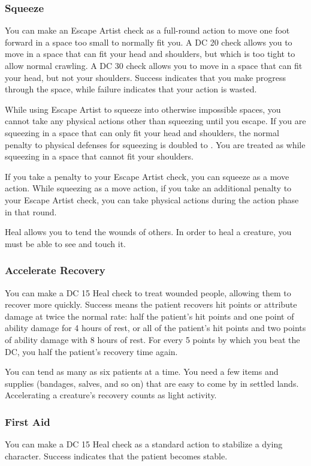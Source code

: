 \subsubsection{Squeeze}
You can make an Escape Artist check as a full-round action to move one foot forward in a space too small to normally fit you. A DC 20 check allows you to move in a space that can fit your head and shoulders, but which is too tight to allow normal crawling. A DC 30 check allows you to move in a space that can fit your head, but not your shoulders. Success indicates that you make progress through the space, while failure indicates that your action is wasted.

While using Escape Artist to squeeze into otherwise impossible spaces, you cannot take any physical actions other than squeezing until you escape. If you are squeezing in a space that can only fit your head and shoulders, the normal penalty to physical defenses for squeezing is doubled to . You are treated as \helpless while squeezing in a space that cannot fit your shoulders.

If you take a  penalty to your Escape Artist check, you can squeeze as a move action. While squeezing as a move action, if you take an additional  penalty to your Escape Artist check, you can take physical actions during the action phase in that round.

Heal allows you to tend the wounds of others. In order to heal a creature, you must be able to see and touch it.

\subsubsection{Accelerate Recovery}
You can make a DC 15 Heal check to treat wounded people, allowing them to recover more quickly. Success means the patient recovers hit points or attribute damage at twice the normal rate: half the patient's hit points and one point of ability damage for 4 hours of rest, or all of the patient's hit points and two points of ability damage with 8 hours of rest. For every 5 points by which you beat the DC, you half the patient's recovery time again.

You can tend as many as six patients at a time. You need a few items and supplies (bandages, salves, and so on) that are easy to come by in settled lands. Accelerating a creature's recovery counts as light activity. %

\subsubsection{First Aid}
You can make a DC 15 Heal check as a standard action to stabilize a dying character. Success indicates that the patient becomes stable.

